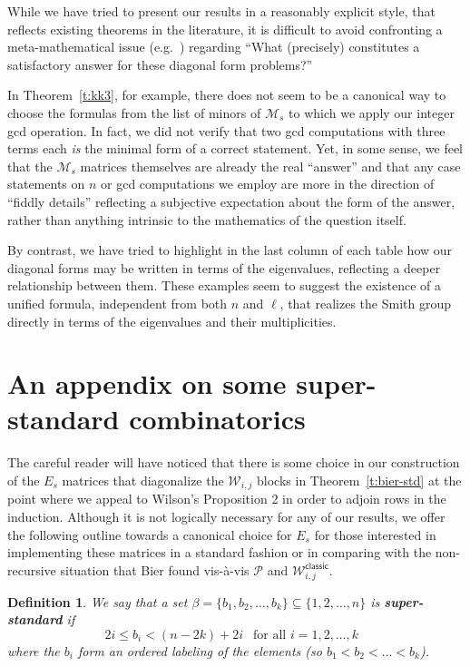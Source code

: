 \documentclass[11pt]{article}
\newtheorem{definition}[theo]{Definition}
\theoremstyle{definition}
\providecommand{\eg}{e.g.\ }
\numberwithin{equation}{section}
\numberwithin{equation}{section}
\renewcommand{\P}{\mathcal{P}}
\newcommand{\M}{\mathcal{M}}
\newcommand{\W}{\mathcal{W}}
\begin{document}
\bigskip
While we have tried to present our results in a reasonably explicit style, that reflects existing theorems in the literature, it is difficult to avoid confronting a meta-mathematical issue (\eg \cite{wilf}) regarding ``What (precisely) constitutes a satisfactory answer for these diagonal form problems?''  

In Theorem~\ref{t:kk3}, for example, there does not seem to be a canonical way to choose the formulas from the list of minors of $\M_s$ to which we apply our integer gcd operation.  In fact, we did not verify that two gcd computations with three terms each {\em is} the minimal form of a correct statement.  Yet, in some sense, we feel that the $\M_s$ matrices themselves are already the real ``answer'' and that any case statements on $n$ or gcd computations we employ are more in the direction of ``fiddly details'' reflecting a subjective expectation about the form of the answer, rather than anything intrinsic to the mathematics of the question itself.

By contrast, we have tried to highlight in the last column of each table how our diagonal forms may be written in terms of the eigenvalues, reflecting a deeper relationship between them.  These examples seem to suggest the existence of a unified formula, independent from both $n$ and $\ell$, that realizes the Smith group directly in terms of the eigenvalues and their multiplicities.


\appendix
\section*{An appendix on some super-standard combinatorics}
\setcounter{section}{5}
\setcounter{theo}{0}
\setlength{\arraycolsep}{1.5pt}
\setcounter{MaxMatrixCols}{99}

The careful reader will have noticed that there is some choice in our construction of the $E_s$ matrices that diagonalize the $\W_{i,j}$ blocks in Theorem~\ref{t:bier-std} at the point where we appeal to Wilson's Proposition 2 in order to adjoin rows in the induction.  Although it is not logically necessary for any of our results, we offer the following outline towards a canonical choice for $E_s$ for those interested in implementing these matrices in a standard fashion or in comparing with the non-recursive situation that Bier found vis-\`a-vis $\P$ and $\W_{i,j}^{\mathsf{classic}}$.

\begin{definition}
We say that a set $\beta = \{b_1, b_2, \ldots, b_k\} \subseteq \{1, 2, \ldots, n\}$ is {\bf super-standard} if 
\[ 2i \leq b_i < (n-2k) + 2i \ \ \text{ for all $i = 1, 2, \ldots, k$ } \]
where the $b_i$ form an ordered labeling of the elements (so $b_1 < b_2 < \ldots < b_k$).
\end{definition}
\end{document}
